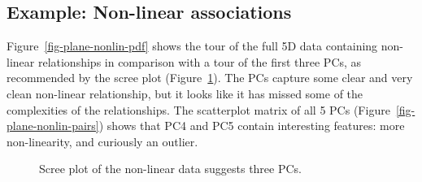 \documentclass[
  letterpaper,
]{krantz}
\begin{document}
\subsection{Example: Non-linear
associations}\label{example-non-linear-associations}


Figure~\ref{fig-plane-nonlin-pdf} shows the tour of the full 5D data
containing non-linear relationships in comparison with a tour of the
first three PCs, as recommended by the scree plot
(Figure~\ref{fig-plane-nonlin-scree}). The PCs capture some clear and
very clean non-linear relationship, but it looks like it has missed some
of the complexities of the relationships. The scatterplot matrix of all
5 PCs (Figure~\ref{fig-plane-nonlin-pairs}) shows that PC4 and PC5
contain interesting features: more non-linearity, and curiously an
outlier.

\begin{figure}


\caption{\label{fig-plane-nonlin-scree}Scree plot of the non-linear data
suggests three PCs.}

\end{figure}%
\end{document}
